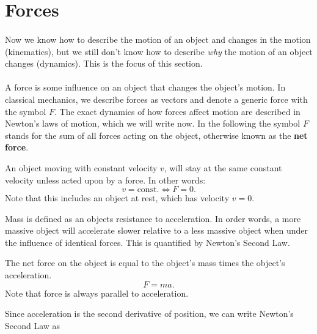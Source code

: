 \documentclass[../classical_mechanics.tex]{subfiles}
\begin{document}
    \section{Forces}
        \paragraph{}
        Now we know how to describe the motion of an object and changes in the motion (kinematics), but we still don't know how to describe \textit{why} the motion of an object changes (dynamics).
        This is the focus of this section.

        \paragraph{}
        A force is some influence on an object that changes the object's motion.
        In classical mechanics, we describe forces as vectors and denote a generic force with the symbol $F$.
        The exact dynamics of how forces affect motion are described in Newton's laws of motion, which we will write now.
        In the following the symbol $F$ stands for the sum of all forces acting on the object, otherwise known as the \textbf{net force}.
        \begin{definition}
            An object moving with constant velocity $v$, will stay at the same constant velocity unless acted upon by a force.
            In other words:
            \begin{equation}
                v=\text{const.}\iff F=0.
            \end{equation}
            Note that this includes an object at rest, which has velocity $v=0$.
        \end{definition}
        Mass is defined as an objects resistance to acceleration.
        In order words, a more massive object will accelerate slower relative to a less massive object when under the influence of identical forces.
        This is quantified by Newton's Second Law.
        \begin{definition}
            The net force on the object is equal to the object's mass times the object's acceleration.
            \begin{equation}
                F=ma.
            \end{equation}
            Note that force is always parallel to acceleration.
        \end{definition}
        Since acceleration is the second derivative of position, we can write Newton's Second Law as
\end{document}
